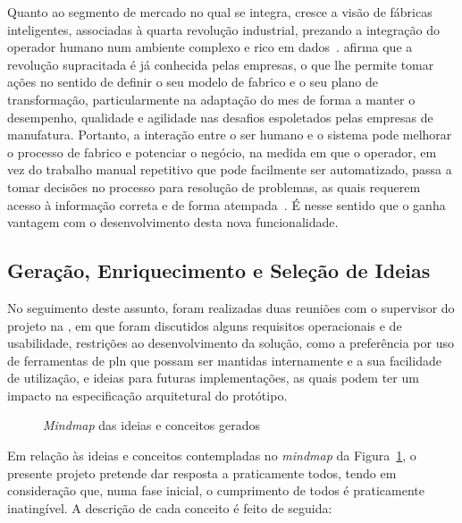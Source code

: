 Quanto ao segmento de mercado no qual se integra, cresce a visão de fábricas inteligentes, associadas à quarta revolução industrial, prezando a integração do operador humano num ambiente complexo e rico em dados~\parencite{social_factory}. \textcite{industry40_revolution_future_mes} afirma que a revolução supracitada é já conhecida pelas empresas, o que lhe permite tomar ações no sentido de definir o seu modelo de fabrico e o seu plano de transformação, particularmente na adaptação do \gls{mes} de forma a manter o desempenho, qualidade e agilidade nas desafios espoletados pelas empresas de manufatura. Portanto, a interação entre o ser humano e o sistema pode melhorar o processo de fabrico e potenciar o negócio, na medida em que o operador, em vez do trabalho manual repetitivo que pode facilmente ser automatizado, passa a tomar decisões no processo para resolução de problemas, as quais requerem acesso à informação correta e de forma atempada~\parencite{social_factory}. É nesse sentido que o {\productname} ganha vantagem com o desenvolvimento desta nova funcionalidade.

\subsection{Geração, Enriquecimento e Seleção de Ideias}
No seguimento deste assunto, foram realizadas duas reuniões com o supervisor do projeto na {\companyname}, em que foram discutidos alguns requisitos operacionais e de usabilidade, restrições ao desenvolvimento da solução, como a preferência por uso de ferramentas de \gls{pln} que possam ser mantidas internamente e a sua facilidade de utilização, e ideias para futuras implementações, as quais podem ter um impacto na especificação arquitetural do protótipo.

\begin{figure}
    \centering
    \resizebox{\textwidth}{!}{}
    \caption{\textit{Mindmap} das ideias e conceitos gerados}
    \label{fig:mindmap}
\end{figure}

Em relação às ideias e conceitos contempladas no \textit{mindmap} da Figura~\ref{fig:mindmap}, o presente projeto pretende dar resposta a praticamente todos, tendo em consideração que, numa fase inicial, o cumprimento de todos é praticamente inatingível. A descrição de cada conceito é feito de seguida:

